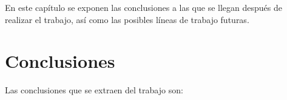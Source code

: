 
En este capítulo se exponen las conclusiones a las que se llegan después de realizar el trabajo, así como las posibles líneas de trabajo futuras.

\section{Conclusiones}

Las conclusiones que se extraen del trabajo son:

